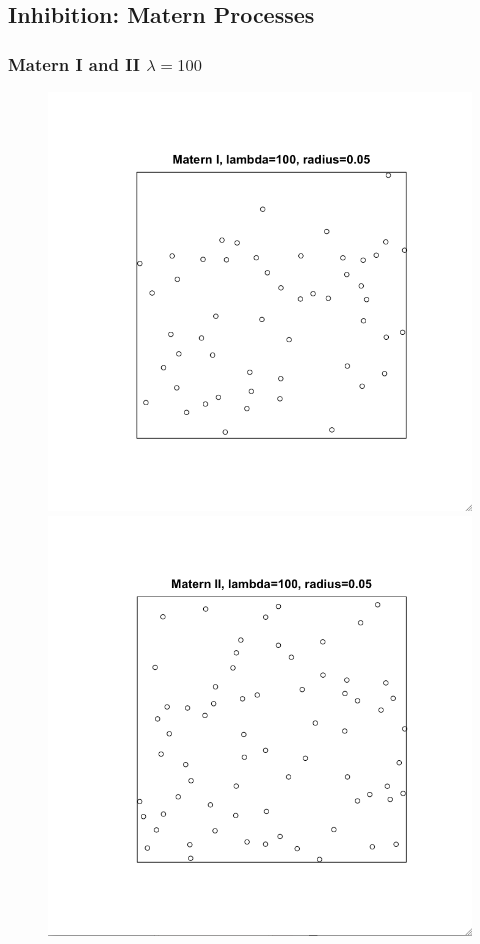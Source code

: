 \documentclass[nototal,handout]{beamer}
\begin{document}
 \subsection{Inhibition: Matern Processes}
\begin{frame}
	\frametitle{Matern I and II $\lambda=100$}
 \begin{figure}[ht]
  \begin{minipage}[b]{0.4\linewidth}
  \centering
  \includegraphics[scale=0.20]{matern1100.png}
  \end{minipage}
  \begin{minipage}[b]{0.4\linewidth}
  \centering
  \includegraphics[scale=0.20]{maternII100.png}
  \end{minipage}

  \end{figure}
 \end{frame} 
\end{document}
